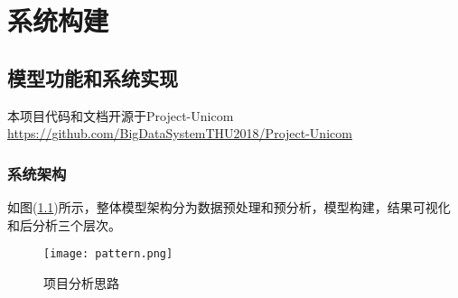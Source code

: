 
\chapter{系统构建} %
\label{AppendixB} %
\section{模型功能和系统实现}

本项目代码和文档开源于Project-Unicom \\ \url{https://github.com/BigDataSystemTHU2018/Project-Unicom}

\subsection{系统架构}
如图(\ref{fig:pattern})所示，整体模型架构分为数据预处理和预分析，模型构建，结果可视化和后分析三个层次。
\begin{figure}[ht]
\centering
\texttt{[image: pattern.png]}
\caption{项目分析思路}
\label{fig:pattern}
\end{figure}
